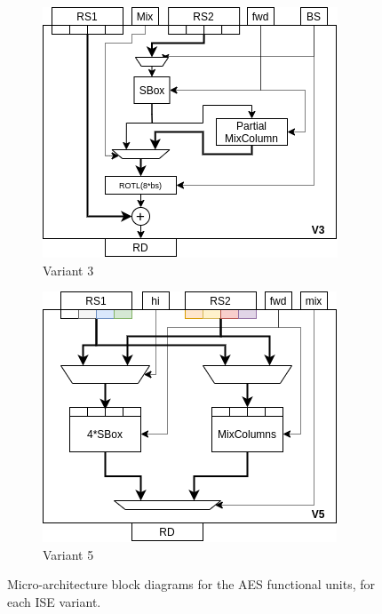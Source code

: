 \begin{figure}
\begin{subfigure}[t]{0.40\textwidth}
    \centering
    \includegraphics[width=\textwidth]{diagrams/ise-datapath-v3.png}
    \caption{Variant 3}
    \label{fig:design:fu_block:v3}
\end{subfigure}
\begin{subfigure}[t]{0.40\textwidth}
    \centering
    \includegraphics[width=\textwidth]{diagrams/ise-datapath-v5.png}
    \caption{Variant 5}
    \label{fig:design:fu_block:v5}
\end{subfigure}

\caption{
Micro-architecture block diagrams for the AES functional units, for
each ISE variant.
}
\end{figure}

